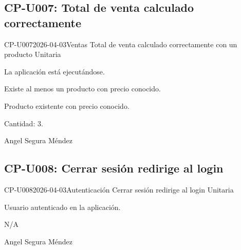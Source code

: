 \subsection{CP-U007: Total de venta calculado correctamente}
\def\cpPasos{%
  \item Navegar a ``Ventas'' \arr{} Nueva venta.
  \item Seleccionar un producto.
  \item Ingresar cantidad 3.
  \item Observar el total calculado automáticamente.}
\def\cpResultadoE{%
  \item Total = precio unitario $\times$ 3.}
\def\cpResultadoO{El sistema calculó correctamente. Precio unitario \CRC{}12,
  cantidad 3, total \CRC{}36.}
\casoprueba
  {CP-U007}{2026-04-03}{Ventas}
  {Total de venta calculado correctamente con un producto}
  {Unitaria}{\estadoAprobado}
  {\item La aplicación está ejecutándose.
   \item Existe al menos un producto con precio conocido.}
  {\item Producto existente con precio conocido.
   \item Cantidad: 3.}
  {Angel Segura Méndez}

\subsection{CP-U008: Cerrar sesión redirige al login}
\def\cpPasos{%
  \item Hacer clic en el botón de cerrar sesión.
  \item Observar si redirige a la pantalla de login.}
\def\cpResultadoE{%
  \item La sesión se cierra y la app muestra la pantalla de login.}
\def\cpResultadoO{Verificado durante las pruebas CP-U002 y CP-U003. El logout
  funcionó correctamente y redirigió al login en ambas ocasiones.}
\casoprueba
  {CP-U008}{2026-04-03}{Autenticación}
  {Cerrar sesión redirige al login}
  {Unitaria}{\estadoAprobado}
  {\item Usuario autenticado en la aplicación.}
  {\item N/A}
  {Angel Segura Méndez}

